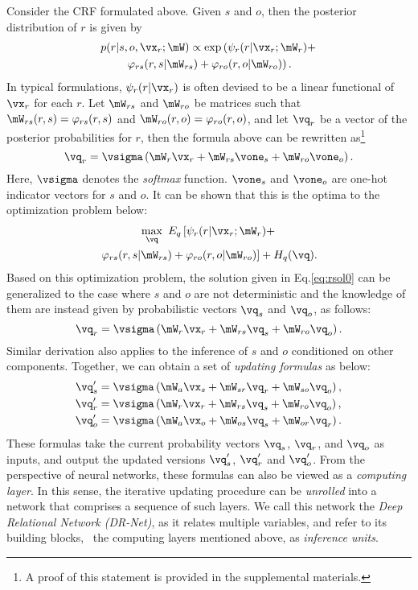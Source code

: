 \documentclass[10pt,twocolumn,letterpaper]{article}
\begin{document}
Consider the CRF formulated above. 
Given $s$ and $o$, then the posterior distribution of $r$ is given by
\begin{multline}
	p(r | s, o, \vx_r; \mW) \propto \exp \left(
		\psi_r(r | \vx_r; \mW_r) + \right. \\
		\left. \varphi_{rs}(r, s | \mW_{rs}) 
		+ \varphi_{ro}(r, o | \mW_{ro})
	\right).
\end{multline}
In typical formulations, 
$\psi_r(r | \vx_r)$ is often devised to be a linear functional of $\vx_r$ for each $r$.
Let $\mW_{rs}$ and $\mW_{ro}$ be matrices such that
$\mW_{rs}(r, s) = \varphi_{rs}(r, s)$ and 
$\mW_{ro}(r, o) = \varphi_{ro}(r, o)$, and
let $\vq_r$ be a vector of the posterior probabilities for $r$, then
the formula above can be rewritten 
as\footnote{A proof of this statement is provided in the supplemental materials.}\begin{equation} \label{eq:rsol0}
	\vq_r = \vsigma \left(
		\mW_r \vx_r + \mW_{rs} \vone_s + \mW_{ro} \vone_o
	\right).	
\end{equation}
Here, $\vsigma$ denotes the \emph{softmax} function.
$\vone_s$ and $\vone_o$ are one-hot indicator vectors for $s$ and $o$.
%
It can be shown that this is the optima to the optimization problem below:
\begin{multline}
	\max_\vq \ E_q \left[ \psi_r(r | \vx_r; \mW_r) + \right. \\
	\left. \varphi_{rs}(r, s | \mW_{rs}) + \varphi_{ro}(r, o | \mW_{ro}) \right] + H_q(\vq).
\end{multline}
Based on this optimization problem, the solution given in Eq.\eqref{eq:rsol0} can be 
generalized to the case where $s$ and $o$ are not deterministic and 
the knowledge of them are instead given by probabilistic vectors $\vq_s$ and $\vq_o$, as follows:
\begin{equation} \label{eq:rso}
	\vq_r = \vsigma \left(
		\mW_r \vx_r + \mW_{rs} \vq_s + \mW_{ro} \vq_o
	\right).	
\end{equation}
Similar derivation also applies to the inference of $s$ and $o$ conditioned on other components. 
Together, we can obtain a set of \emph{updating formulas} as below:
\begin{align} \label{eq:runit}
        \vq'_s & = \vsigma \left( \mW_a \vx_s + \mW_{sr} \vq_r + \mW_{so} \vq_o \right), \notag \\
        \vq'_r & = \vsigma \left( \mW_r \vx_r + \mW_{rs} \vq_s + \mW_{ro} \vq_o \right), \notag \\
        \vq'_o & = \vsigma \left( \mW_a \vx_o + \mW_{os} \vq_s + \mW_{or} \vq_r \right).
\end{align}%
These formulas take the current probability vectors $\vq_s$, $\vq_r$, and $\vq_o$ as inputs, and
output the updated versions $\vq'_s$, $\vq'_r$ and $\vq'_o$. 
%
From the perspective of neural networks, these formulas can also be viewed as a \emph{computing layer}. 
In this sense, the iterative updating procedure can be \emph{unrolled} into a network that comprises 
a sequence of such layers. 
We call this network the \emph{Deep Relational Network (DR-Net)}, as it relates multiple variables, and
refer to its building blocks, \ie~the computing layers mentioned above, as \emph{inference units}.
\end{document}
